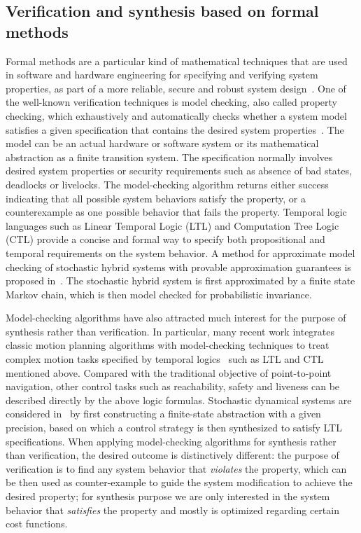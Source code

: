 \subsection{Verification and synthesis based on formal methods}\label{sec:formal}

Formal methods are a particular kind of mathematical techniques that are used in software and hardware engineering for specifying and verifying system properties, as part of a more reliable, secure and robust system design~\cite{clarke1996formal}.
One of the well-known verification techniques is model checking, also called property checking, which exhaustively and automatically checks whether a system model satisfies a given specification that contains the desired system properties~\cite{clarke1999model, baier2008principles, mcmillan1993symbolic}. The model can be an actual hardware or software system or its mathematical abstraction as a finite transition system. The specification normally involves desired system properties or security requirements such as absence of bad states, deadlocks or livelocks. The  model-checking algorithm returns either success indicating that all possible system behaviors satisfy the property, or a counterexample as one possible behavior that fails the property. Temporal logic languages such as Linear Temporal Logic (LTL) and Computation Tree Logic (CTL) provide a concise and formal way to specify both propositional and temporal requirements on the system behavior.
A method for approximate model checking of stochastic hybrid systems with provable approximation guarantees is proposed in~\cite{abate2010approximate}. The stochastic hybrid system is first approximated by a finite state Markov chain, which is then model checked for probabilistic invariance.

Model-checking algorithms have also attracted much interest for the purpose of synthesis rather than verification. In particular, many recent work integrates classic motion planning algorithms with model-checking techniques to treat complex motion tasks specified by temporal logics~\cite{tabuada2003model, belta2007symbolic, fainekos2009temporal, bhatia2010sampling} such as LTL and CTL mentioned above.
Compared with the traditional  objective of point-to-point navigation, other  control tasks such as reachability, safety and liveness can be described directly by the above logic formulas.
Stochastic dynamical systems are considered in~\cite{zamani2014symbolic} by first constructing a finite-state abstraction  with a given precision, based on which a control strategy is then synthesized to satisfy LTL specifications.
When applying model-checking algorithms for synthesis rather than verification, the desired outcome is distinctively different:  the purpose of verification is to find any system behavior that \emph{violates} the property, which can be then used as counter-example to guide the system modification to achieve the desired property;  for synthesis purpose we are only interested in the system behavior that \emph{satisfies} the property and mostly is optimized regarding certain cost functions.

